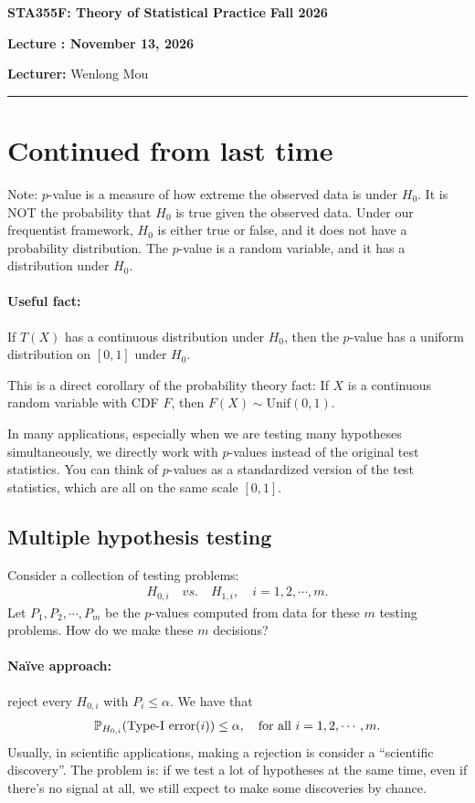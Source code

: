 \documentclass[11pt,letterpaper]{article}
\newcommand{\coursenumber}{STA355F}
\newcommand{\coursetitle}{Theory of Statistical Practice}
\newcommand{\courseterm}{Fall 2026}
\newcounter{lecture}
\newcommand{\lecturenumber}{\arabic{lecture}}
\newcommand{\lecturedate}{November 13, 2026}
\newcommand{\lecturer}{Wenlong Mou}
\numberwithin{assumption}{lecture}
\numberwithin{theorem}{lecture}
\numberwithin{proposition}{lecture}
\numberwithin{lemma}{lecture}
\numberwithin{claim}{lecture}
\numberwithin{corollary}{lecture}
\numberwithin{definition}{lecture}
\numberwithin{conjecture}{lecture}
\numberwithin{remark}{lecture}
\numberwithin{example}{lecture}
\numberwithin{equation}{lecture}
\newcommand{\makelecturenotesheader}{%
  \noindent
  \textbf{\coursenumber: \coursetitle}%
  \hfill
  \textbf{\courseterm}

  \begin{center}
    {\Large\bfseries Lecture \lecturenumber: \lecturedate}
  \end{center}

  \noindent
  \textbf{Lecturer:} \lecturer
  \par\medskip
  \hrule
  \bigskip
}
\begin{document}
\makelecturenotesheader

\section{Continued from last time}
Note: $p$-value is a measure of how extreme the observed data is under $H_0$. It is NOT the probability that $H_0$ is true given the observed data. Under our frequentist framework, $H_0$ is either true or false, and it does not have a probability distribution. The $p$-value is a random variable, and it has a distribution under $H_0$.

\paragraph{Useful fact:} If $T(X)$ has a continuous distribution under $H_0$, then the $p$-value has a uniform distribution on $[0,1]$ under $H_0$.

This is a direct corollary of the probability theory fact: If $X$ is a continuous random variable with CDF $F$, then $F(X) \sim \mathrm{Unif} (0,1)$.

In many applications, especially when we are testing many hypotheses simultaneously, we directly work with $p$-values instead of the original test statistics. You can think of $p$-values as a standardized version of the test statistics, which are all on the same scale $[0,1]$.

\subsection{Multiple hypothesis testing}
Consider a collection of testing problems:
\begin{align*}
H_{0, i} \quad vs. \quad H_{1, i}, \quad i = 1, 2, \cdots, m.
\end{align*}
Let $P_1, P_2, \cdots, P_m$ be the $p$-values computed from data for these $m$ testing problems. How do we make these $m$ decisions?

\paragraph{Na\"{i}ve approach:} reject every $H_{0, i}$ with $P_i \leq \alpha$. We have that
\begin{align*}
{\mathbb{P}}_{H_{0, i}} (\mbox{Type-I error} (i)) \leq \alpha, \quad \text{for all } i = 1, 2, \cdots, m.
\end{align*}
Usually, in scientific applications, making a rejection is consider a ``scientific discovery''. The problem is: if we test a lot of hypotheses at the same time, even if there's no signal at all, we still expect to make some discoveries by chance.
\end{document}
